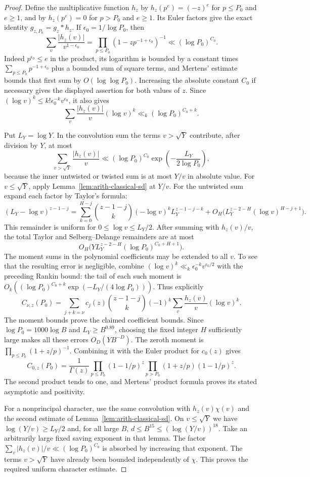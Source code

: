 \begin{proof}
Define the multiplicative function $h_z$ by
$h_z(p^e)=(-z)^e$ for $p\le P_0$ and $e\ge1$, and by
$h_z(p^e)=0$ for $p>P_0$ and $e\ge1$.  Its Euler factors give the exact identity
$g_{z,P_0}=g_z*h_z$.  If $\epsilon_0=1/\log P_0$, then
\[
 \sum_v\frac{|h_z(v)|}{v^{1-\epsilon_0}}
 =\prod_{p\le P_0}(1-zp^{-1+\epsilon_0})^{-1}
       \ll(\log P_0)^{C_0}.
\]
Indeed $p^{\epsilon_0}\le e$ in the product, its logarithm is bounded by
a constant times $\sum_{p\le P_0}p^{-1+\epsilon_0}$ plus a bounded sum of
square terms, and Mertens' estimate bounds that first sum by
$O(\log\log P_0)$.  Increasing the absolute constant $C_0$ if necessary gives
the displayed assertion for both values of $z$.  Since
$(\log v)^k\le k!\epsilon_0^{-k}v^{\epsilon_0}$, it also gives
\[
 \sum_v\frac{|h_z(v)|}{v}(\log v)^k
       \ll_k(\log P_0)^{C_0+k}.
\]

Put $L_Y=\log Y$.  In the convolution sum the terms $v>\sqrt Y$ contribute,
after division by $Y$, at most
\[
 \sum_{v>\sqrt Y}\frac{|h_z(v)|}{v}
       \ll(\log P_0)^{C_0}\exp\left(-\frac{L_Y}{2\log P_0}\right),
\]
because the inner untwisted or twisted sum is at most $Y/v$ in absolute
value.  For $v\le\sqrt Y$, apply Lemma~\ref{lem:arith-classical-sd} at $Y/v$.
For the untwisted sum expand each factor by Taylor's formula:
\[
 (L_Y-\log v)^{z-1-j}
 =\sum_{k=0}^{H-j}\binom{z-1-j}{k}(-\log v)^kL_Y^{z-1-j-k}
  +O_H\bigl(L_Y^{z-2-H}(\log v)^{H-j+1}\bigr).
\]
This remainder is uniform for $0\le\log v\le L_Y/2$.
After summing with $h_z(v)/v$, the total Taylor and Selberg--Delange
remainders are at most
\[
 O_H\bigl(Y L_Y^{z-2-H}(\log P_0)^{C_0+H+1}\bigr).
\]
The moment sums in the polynomial coefficients may be extended to all $v$.
To see that the resulting error is negligible, combine
$(\log v)^k\ll_k\epsilon_0^{-k}v^{\epsilon_0/2}$ with the preceding Rankin
bound: the tail of each such moment is
$O_k((\log P_0)^{C_0+k}\exp(-L_Y/(4\log P_0)))$.
Thus explicitly
\[
 C_{\nu,z}(P_0)=
 \sum_{j+k=\nu}c_j(z)\binom{z-1-j}{k}(-1)^k
       \sum_v\frac{h_z(v)}v(\log v)^k.
\]
The moment bounds prove the claimed coefficient bounds.  Since
$\log P_0=1000\log B$ and $L_Y\ge B^{0.89}$, choosing the fixed integer $H$
sufficiently large makes all these errors $O_D(YB^{-D})$.
The zeroth moment is $\prod_{p\le P_0}(1+z/p)^{-1}$.  Combining it with the
Euler product for $c_0(z)$ gives
\[
 C_{0,z}(P_0)=\frac1{\Gamma(z)}
    \prod_{p\le P_0}(1-1/p)^z
    \prod_{p>P_0}(1+z/p)(1-1/p)^z.
\]
The second product tends to one, and Mertens' product formula proves its
stated asymptotic and positivity.

For a nonprincipal character, use the same convolution with
$h_z(v)\chi(v)$ and the second estimate of
Lemma~\ref{lem:arith-classical-sd}.  On $v\le\sqrt Y$ we have
$\log(Y/v)\ge L_Y/2$ and, for all large $B$,
$d\le B^{15}\le(\log(Y/v))^{18}$.
Take an arbitrarily large fixed saving exponent in that lemma.  The factor
$\sum_v|h_z(v)|/v\ll(\log P_0)^{C_0}$ is absorbed by increasing that exponent.
The terms $v>\sqrt Y$ have already been bounded independently of $\chi$.
This proves the required uniform character estimate.
\end{proof}


